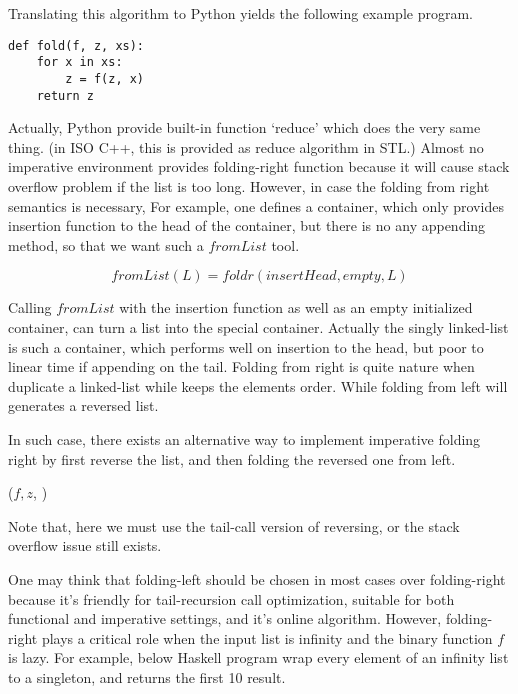 \documentclass{article}
\begin{document}
Translating this algorithm to Python yields the following example program.

\lstset{language=Python}
\begin{lstlisting}
def fold(f, z, xs):
    for x in xs:
        z = f(z, x)
    return z
\end{lstlisting}

Actually, Python provide built-in function `reduce' which does the very same thing. (in ISO C++, this is
provided as reduce algorithm in STL.) Almost no imperative environment provides folding-right function because
it will cause stack overflow problem if the list is too long. However, in case the folding from right
semantics is necessary, For example, one defines a container, which only provides insertion function to
the head of the container, but there is no any appending method, so that we want such a $fromList$
tool.

\[
fromList(L) = foldr(insertHead, empty, L)
\]

Calling $fromList$ with the insertion function as well as an empty initialized container, can turn a list 
into the special container. Actually the singly linked-list is such a container, which performs well
on insertion to the head, but poor to linear time if appending on the tail. Folding from right is quite
nature when duplicate a linked-list while keeps the elements order. While folding from left will generates
a reversed list.

In such case, there exists an alternative way to implement imperative folding right by first reverse the list, and then
folding the reversed one from left.

\begin{algorithmic}
  \State \Return {}($f, z$, )
\EndFunction
\end{algorithmic}

Note that, here we must use the tail-call version of reversing, or the stack overflow issue still exists.

One may think that folding-left should be chosen in most cases over folding-right because it's friendly for 
tail-recursion call optimization, suitable for both functional and imperative settings, and it's online
algorithm. However, folding-right plays a critical role when the input list is infinity and the binary function
$f$ is lazy. For example, below Haskell program wrap every element of an infinity list to a singleton, and
returns the first 10 result.
\end{document}
